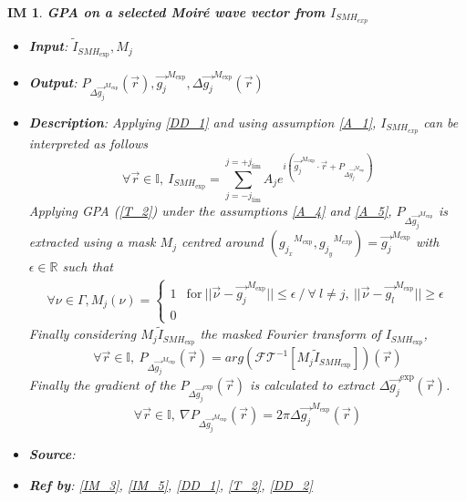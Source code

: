\documentclass[12pt]{article}
\newtheorem{IM}{IM}
\begin{document}
\begin{IM}
\label{IM_2}
\noindent\colorbox{shadecolorIM}{\normalfont \textbf{GPA on a selected Moir{\'e} 
wave vector from $I_{SMH_{exp}}$}}
\normalfont
\begin{itemize}
\item \textbf{Input}: $\widetilde{I}_{\mathit{SMH}_{\text{exp}}}, M_j$
\item \textbf{Output}: $P_{\Delta 
\overrightarrow{g_{j}}^{M_{\text{exp}}}}(\vec{r}), 
\overrightarrow{g_{j}}^{M_{\text{exp}}}, \Delta 
\overrightarrow{g_{j}}^{M_{\text{exp}}}(\vec{r})$
\item \textbf{Description}: Applying \cref{DD_1} and using assumption 
\cref{A_1}, $I_{SMH_{exp}}$ can be interpreted as follows
\begin{equation}
\forall \vec{r} \in \mathbb{I},\ 
I_{\mathit{SMH}_{\text{exp}}}=\sum_{j=-j_{\text{lim}}}^{j=+j_{\text{lim}}}A_je^{i(\overrightarrow{g_{j}}^{M_{\text{exp}}}\cdot\vec{r}+P_{\Delta 
\overrightarrow{g_{j}}^{M_{\text{exp}}}})}
\end{equation}
Applying GPA (\cref{T_2}) under the assumptions \cref{A_4} and \cref{A_5}, 
$P_{\Delta \overrightarrow{g_{j}}^{M_{\text{exp}}}}$ is extracted using a mask 
$M_j$ centred around 
$({g_{j_x}}^{M_{\text{exp}}},{g_{j_y}}^{M_{exp}})=\overrightarrow{g_{j}}^{M_{\text{exp}}}$ 
with $\epsilon \in \mathbb{R}$ such that
\begin{equation}
\begin{gathered}
\forall \nu \in \Gamma, M_j(\nu) = 
\begin{cases}
1 & \text{for} \ 
||\vec{\nu}-\overrightarrow{g_{j}}^{M_{\text{exp}}}||\leq\epsilon \ / \ \forall 
\ l\neq j, \ ||\vec{\nu}-\overrightarrow{g_{l}}^{M_{\text{exp}}}||\geq \epsilon 
\\
0
\end{cases}
\end{gathered}
\end{equation}
Finally considering $M_j\widetilde{I}_{\mathit{SMH}_{\text{exp}}}$ the masked 
Fourier transform of $I_{\mathit{SMH}_{\text{exp}}}$,
\begin{equation}
\forall \vec{r} \in \mathbb{I},\ P_{\Delta 
\overrightarrow{g_{j}}^{M_{\text{exp}}}}(\vec{r})=arg(\mathcal{FT}^{-1}[M_j\widetilde{I}_{\mathit{SMH}_{\text{exp}}}])(\vec{r})
\end{equation}
Finally the gradient of the $P_{\Delta 
\overrightarrow{g_{j}}^{\text{exp}}}(\vec{r})$ is calculated to extract ${\Delta 
\overrightarrow{g_{j}}^{\text{exp}}}(\vec{r})$.
\begin{equation}
\forall \vec{r} \in \mathbb{I},\ \nabla P_{\Delta 
\overrightarrow{g_{j}}^{M_{\text{exp}}}}(\vec{r})=2\pi\Delta 
\overrightarrow{g_{j}}^{M_{\text{exp}}}(\vec{r})
\end{equation}
\item \textbf{Source}: \cite{Hytch1998}
\item \textbf{Ref by}: \cref{IM_3}, \cref{IM_5}, \cref{DD_1}, \cref{T_2}, 
\cref{DD_2}
\end{itemize}
\end{IM}
\end{document}
